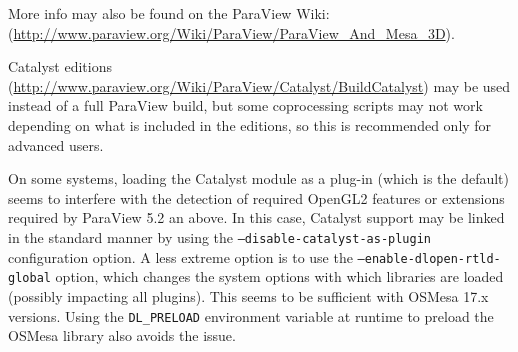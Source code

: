 \documentclass[a4paper,10pt,twoside]{csshortdoc}
\begin{document}

More info may also be found on the ParaView Wiki:
(\url{http://www.paraview.org/Wiki/ParaView/ParaView_And_Mesa_3D}).

Catalyst editions
(\url{http://www.paraview.org/Wiki/ParaView/Catalyst/BuildCatalyst})
may be used instead of a full ParaView build, but some
coprocessing scripts may not work depending on what is included in the
editions, so this is recommended only for advanced users.

On some systems, loading the Catalyst module as a plug-in (which is the
default) seems to interfere with the detection of required OpenGL2 features
or extensions required by ParaView 5.2 an above. In this case, Catalyst
support may be linked in the standard manner by using the
\texttt{--disable-catalyst-as-plugin} configuration option.
A less extreme option is to use the \texttt{--enable-dlopen-rtld-global}
option, which changes the system options with which libraries are loaded
(possibly impacting all plugins). This seems to be sufficient with
OSMesa 17.x versions. Using the \texttt{DL\_PRELOAD} environment variable
at runtime to preload the OSMesa library also avoids the issue.
\end{document}
